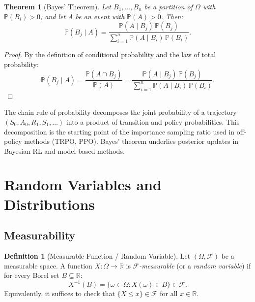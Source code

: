 \documentclass[11pt,a4paper]{article}
\theoremstyle{definition}
\newtheorem{definition}{Definition}[section]
\theoremstyle{plain}
\newtheorem{theorem}{Theorem}[section]
\theoremstyle{remark}
\newcommand{\R}{\mathbb{R}}
\newcommand{\Prob}{\mathbb{P}}
\begin{document}
\begin{keyresult}
\begin{theorem}[Bayes' Theorem]
\label{thm:bayes}
Let $B_1, \ldots, B_n$ be a partition of $\Omega$ with $\Prob(B_i) > 0$, and let $A$ be an event with $\Prob(A) > 0$. Then:
\begin{equation}
    \Prob(B_j \mid A) = \frac{\Prob(A \mid B_j)\, \Prob(B_j)}{\sum_{i=1}^n \Prob(A \mid B_i)\, \Prob(B_i)}.
    \label{eq:bayes}
\end{equation}
\end{theorem}
\end{keyresult}

\begin{proof}
By the definition of conditional probability and the law of total probability:
\begin{equation}
    \Prob(B_j \mid A) = \frac{\Prob(A \cap B_j)}{\Prob(A)} = \frac{\Prob(A \mid B_j)\, \Prob(B_j)}{\sum_{i=1}^n \Prob(A \mid B_i)\, \Prob(B_i)}.
\end{equation}
\end{proof}

\begin{rlconnection}[Connection to RL]
The chain rule of probability decomposes the joint probability of a trajectory $(S_0, A_0, R_1, S_1, \ldots)$ into a product of transition and policy probabilities. This decomposition is the starting point of the importance sampling ratio used in off-policy methods (TRPO, PPO). Bayes' theorem underlies posterior updates in Bayesian RL and model-based methods.
\end{rlconnection}

\section{Random Variables and Distributions}
\label{sec:random_variables}

\subsection{Measurability}
\label{subsec:measurability}

\begin{definition}[Measurable Function / Random Variable]
\label{def:measurable}
Let $(\Omega, \mathcal{F})$ be a measurable space. A function $X: \Omega \to \R$ is \emph{$\mathcal{F}$-measurable} (or a \emph{random variable}) if for every Borel set $B \subseteq \R$:
\begin{equation}
    X^{-1}(B) = \{\omega \in \Omega : X(\omega) \in B\} \in \mathcal{F}.
    \label{eq:measurable}
\end{equation}
Equivalently, it suffices to check that $\{X \leq x\} \in \mathcal{F}$ for all $x \in \R$.
\end{definition}
\end{document}
